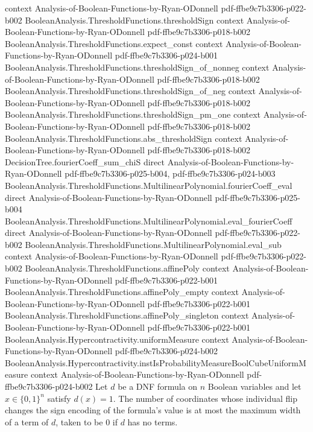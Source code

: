 \begin{lemma}
  {context}
  {Analysis-of-Boolean-Functions-by-Ryan-ODonnell}
  {pdf-ffbe9c7b3306-p022-b002}
\proofstep
  {BooleanAnalysis.ThresholdFunctions.thresholdSign}
  {context}
  {Analysis-of-Boolean-Functions-by-Ryan-ODonnell}
  {pdf-ffbe9c7b3306-p018-b002}
\proofstep
  {BooleanAnalysis.ThresholdFunctions.expect_const}
  {context}
  {Analysis-of-Boolean-Functions-by-Ryan-ODonnell}
  {pdf-ffbe9c7b3306-p024-b001}
\proofstep
  {BooleanAnalysis.ThresholdFunctions.thresholdSign_of_nonneg}
  {context}
  {Analysis-of-Boolean-Functions-by-Ryan-ODonnell}
  {pdf-ffbe9c7b3306-p018-b002}
\proofstep
  {BooleanAnalysis.ThresholdFunctions.thresholdSign_of_neg}
  {context}
  {Analysis-of-Boolean-Functions-by-Ryan-ODonnell}
  {pdf-ffbe9c7b3306-p018-b002}
\proofstep
  {BooleanAnalysis.ThresholdFunctions.thresholdSign_pm_one}
  {context}
  {Analysis-of-Boolean-Functions-by-Ryan-ODonnell}
  {pdf-ffbe9c7b3306-p018-b002}
\proofstep
  {BooleanAnalysis.ThresholdFunctions.abs_thresholdSign}
  {context}
  {Analysis-of-Boolean-Functions-by-Ryan-ODonnell}
  {pdf-ffbe9c7b3306-p018-b002}
\proofstep
  {DecisionTree.fourierCoeff_sum_chiS}
  {direct}
  {Analysis-of-Boolean-Functions-by-Ryan-ODonnell}
  {pdf-ffbe9c7b3306-p025-b004,
    pdf-ffbe9c7b3306-p024-b003}
\proofstep
  {BooleanAnalysis.ThresholdFunctions.MultilinearPolynomial.fourierCoeff_eval}
  {direct}
  {Analysis-of-Boolean-Functions-by-Ryan-ODonnell}
  {pdf-ffbe9c7b3306-p025-b004}
\proofstep
  {BooleanAnalysis.ThresholdFunctions.MultilinearPolynomial.eval_fourierCoeff}
  {direct}
  {Analysis-of-Boolean-Functions-by-Ryan-ODonnell}
  {pdf-ffbe9c7b3306-p022-b002}
\proofstep
  {BooleanAnalysis.ThresholdFunctions.MultilinearPolynomial.eval_sub}
  {context}
  {Analysis-of-Boolean-Functions-by-Ryan-ODonnell}
  {pdf-ffbe9c7b3306-p022-b002}
\proofstep
  {BooleanAnalysis.ThresholdFunctions.affinePoly}
  {context}
  {Analysis-of-Boolean-Functions-by-Ryan-ODonnell}
  {pdf-ffbe9c7b3306-p022-b001}
\proofstep
  {BooleanAnalysis.ThresholdFunctions.affinePoly_empty}
  {context}
  {Analysis-of-Boolean-Functions-by-Ryan-ODonnell}
  {pdf-ffbe9c7b3306-p022-b001}
\proofstep
  {BooleanAnalysis.ThresholdFunctions.affinePoly_singleton}
  {context}
  {Analysis-of-Boolean-Functions-by-Ryan-ODonnell}
  {pdf-ffbe9c7b3306-p022-b001}
\proofstep
  {BooleanAnalysis.Hypercontractivity.uniformMeasure}
  {context}
  {Analysis-of-Boolean-Functions-by-Ryan-ODonnell}
  {pdf-ffbe9c7b3306-p024-b002}
\proofstep
  {BooleanAnalysis.Hypercontractivity.instIsProbabilityMeasureBoolCubeUniformMeasure}
  {context}
  {Analysis-of-Boolean-Functions-by-Ryan-ODonnell}
  {pdf-ffbe9c7b3306-p024-b002}
Let $d$ be a DNF formula on $n$ Boolean variables and let $x\in\{0,1\}^n$ satisfy
$d(x)=1$. The number of coordinates whose individual flip changes the sign encoding of
the formula's value is at most the maximum width of a term of $d$, taken to be $0$ if
$d$ has no terms.
\end{lemma}


